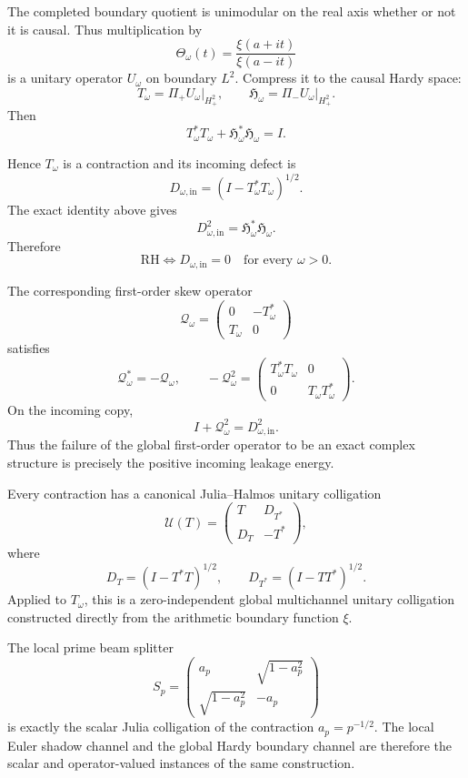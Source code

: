 \documentclass[11pt]{article}
\theoremstyle{definition}
\theoremstyle{remark}
\begin{document}
The completed boundary quotient is unimodular on the real axis whether or not it is
causal.  Thus multiplication by
\[
\Theta_\omega(t)=\frac{\xi(a+it)}{\xi(a-it)}
\]
is a unitary operator \(U_\omega\) on boundary \(L^2\).  Compress it to the causal Hardy
space:
\[
T_\omega
=
\Pi_+U_\omega\big|_{H^2_+},
\qquad
\mathfrak H_\omega
=
\Pi_-U_\omega\big|_{H^2_+}.
\]
Then
\[
\boxed{
T_\omega^*T_\omega
+
\mathfrak H_\omega^*\mathfrak H_\omega
=
I.
}
\]

Hence \(T_\omega\) is a contraction and its incoming defect is
\[
D_{\omega,\mathrm{in}}
=
(I-T_\omega^*T_\omega)^{1/2}.
\]
The exact identity above gives
\[
D_{\omega,\mathrm{in}}^2
=
\mathfrak H_\omega^*\mathfrak H_\omega.
\]
Therefore
\[
\boxed{
\mathrm{RH}
\iff
D_{\omega,\mathrm{in}}=0
\quad\text{for every }\omega>0.
}
\]

The corresponding first-order skew operator
\[
\mathcal Q_\omega
=
\begin{pmatrix}
0&-T_\omega^*\\
T_\omega&0
\end{pmatrix}
\]
satisfies
\[
\mathcal Q_\omega^*=-\mathcal Q_\omega,
\qquad
-\mathcal Q_\omega^2
=
\begin{pmatrix}
T_\omega^*T_\omega&0\\
0&T_\omega T_\omega^*
\end{pmatrix}.
\]
On the incoming copy,
\[
\boxed{
I+\mathcal Q_\omega^2
=
D_{\omega,\mathrm{in}}^2.
}
\]
Thus the failure of the global first-order operator to be an exact complex structure is
precisely the positive incoming leakage energy.

Every contraction has a canonical Julia--Halmos unitary colligation
\[
\mathcal U(T)=
\begin{pmatrix}
T&D_{T^*}\\
D_T&-T^*
\end{pmatrix},
\]
where
\[
D_T=(I-T^*T)^{1/2},
\qquad
D_{T^*}=(I-TT^*)^{1/2}.
\]
Applied to \(T_\omega\), this is a zero-independent global multichannel unitary
colligation constructed directly from the arithmetic boundary function \(\xi\).

The local prime beam splitter
\[
S_p=
\begin{pmatrix}
a_p&\sqrt{1-a_p^2}\\
\sqrt{1-a_p^2}&-a_p
\end{pmatrix}
\]
is exactly the scalar Julia colligation of the contraction \(a_p=p^{-1/2}\).  The local
Euler shadow channel and the global Hardy boundary channel are therefore the scalar and
operator-valued instances of the same construction.
\end{document}

